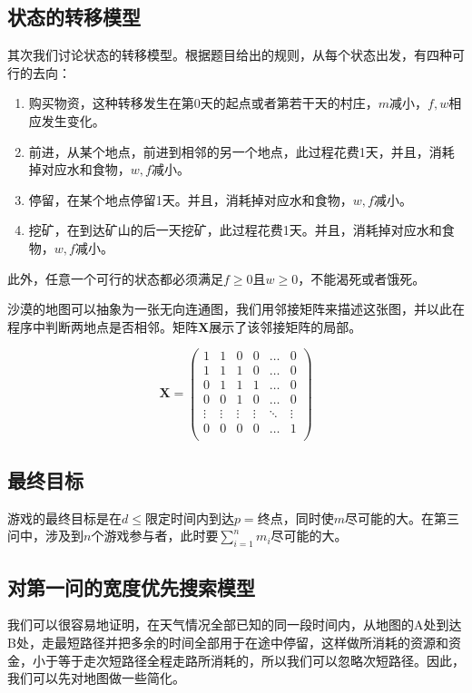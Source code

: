 \documentclass[withoutpreface,bwprint]{cumcmthesis} %
\begin{document}
\subsection{状态的转移模型}
其次我们讨论状态的转移模型。根据题目给出的规则，从每个状态出发，有四种可行的去向：
\begin{enumerate}
    \item 购买物资，这种转移发生在第0天的起点或者第若干天的村庄，\(m\)减小，\(f,w\)相应发生变化。
    \item 前进，从某个地点，前进到相邻的另一个地点，此过程花费1天，并且，消耗掉对应水和食物，\(w,f\)减小。
    \item 停留，在某个地点停留1天。并且，消耗掉对应水和食物，\(w,f\)减小。
    \item 挖矿，在到达矿山的后一天挖矿，此过程花费1天。并且，消耗掉对应水和食物，\(w,f\)减小。
\end{enumerate}

此外，任意一个可行的状态都必须满足\(f\geq 0\)且\(w\geq 0\)，不能渴死或者饿死。

沙漠的地图可以抽象为一张无向连通图，我们用邻接矩阵来描述这张图，并以此在程序中判断两地点是否相邻。矩阵\(\mathbf{X}\)展示了该邻接矩阵的局部。

\[
\mathbf{X} = \left(
    \begin{array}{cccccc}
    1 & 1 & 0 & 0 & \ldots & 0\\
    1 & 1 & 1 & 0 & \ldots & 0\\
    0 & 1 & 1 & 1 & \ldots & 0\\
    0 & 0 & 1 & 0 & \ldots & 0\\
    \vdots & \vdots & \vdots & \vdots & \ddots & \vdots\\
    0 & 0 & 0 & 0 & \ldots & 1\\
    \end{array} \right)
\]

\subsection{最终目标}

游戏的最终目标是在\(d\leq\)限定时间内到达\(p=\)终点，同时使\(m\)尽可能的大。在第三问中，涉及到\(n\)个游戏参与者，此时要\(\sum_{i=1}^n m_i\)尽可能的大。

\subsection{对第一问的宽度优先搜索模型}

我们可以很容易地证明，在天气情况全部已知的同一段时间内，从地图的A处到达B处，走最短路径并把多余的时间全部用于在途中停留，这样做所消耗的资源和资金，小于等于走次短路径全程走路所消耗的，所以我们可以忽略次短路径。因此，我们可以先对地图做一些简化。
\end{document}
